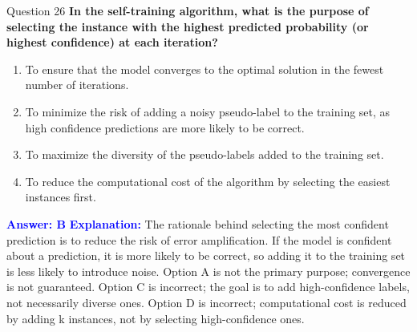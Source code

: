 \documentclass[8pt]{beamer}  %
\begin{document}
	\begin{frame}{Question 26}
		\textbf{In the self-training algorithm, what is the purpose of selecting the instance with the highest predicted probability (or highest confidence) at each iteration?}
		\begin{enumerate}
			\item To ensure that the model converges to the optimal solution in the fewest number of iterations.
			\item To minimize the risk of adding a noisy pseudo-label to the training set, as high confidence predictions are more likely to be correct.
			\item To maximize the diversity of the pseudo-labels added to the training set.
			\item To reduce the computational cost of the algorithm by selecting the easiest instances first.
		\end{enumerate}
		\vspace{0.2cm}
		\textcolor{blue}{\textbf{Answer: B}}
		\vspace{0.2cm}
		\textcolor{blue}{\textbf{Explanation:}} The rationale behind selecting the most confident prediction is to reduce the risk of error amplification. If the model is confident about a prediction, it is more likely to be correct, so adding it to the training set is less likely to introduce noise. Option A is not the primary purpose; convergence is not guaranteed. Option C is incorrect; the goal is to add high-confidence labels, not necessarily diverse ones. Option D is incorrect; computational cost is reduced by adding k instances, not by selecting high-confidence ones.
	\end{frame}
	
\end{document}
